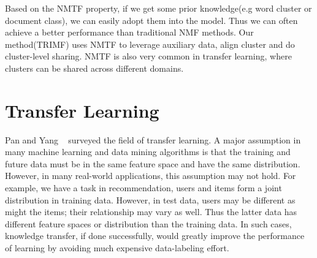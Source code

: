 Based on the NMTF property, if we get some prior knowledge(e.g word cluster or document class), we can easily adopt them into the model. Thus we can often achieve a better performance than traditional NMF methods. Our method(TRIMF) uses NMTF to leverage auxiliary data, align cluster and do cluster-level sharing. NMTF is also very common in transfer learning, where clusters can be shared across different domains.


\hspace{0.1in}
\section{Transfer Learning} Pan and Yang ~\cite{/tkde/sinno09survey} surveyed the field of transfer learning. A major assumption in many machine learning and data mining algorithms is that the training and future data must be in the same feature space and have the same distribution. However, in many real-world applications, this assumption may not hold. For example, we have a task in recommendation, users and items form a joint distribution in training data. However, in test data, users may be different as might the items; their relationship may vary as well. Thus the latter data has different feature spaces or distribution than the training data. In such cases, knowledge transfer, if done successfully, would greatly improve the performance of learning by avoiding much expensive data-labeling effort.

\hspace{0.05in}
